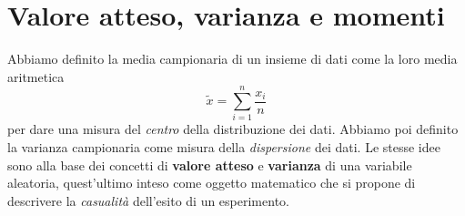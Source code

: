 \section{Valore atteso, varianza e momenti}
Abbiamo definito la media campionaria di un insieme di dati come la loro media aritmetica
\[ \tilde{x} = \sum_{i=1}^n \frac{x_i}{n} \]
per dare una misura del \emph{centro} della distribuzione dei dati. Abbiamo poi definito la
varianza campionaria come misura della \emph{dispersione} dei dati. Le stesse idee sono alla base
dei concetti di \textbf{valore atteso} e \textbf{varianza} di una variabile aleatoria, quest'ultimo
inteso come oggetto matematico che si propone di descrivere la \emph{casualità} dell'esito di un
esperimento.

